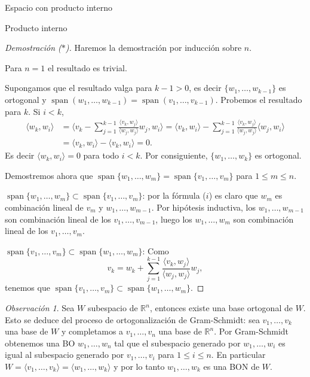 \documentclass[a4paper,12pt,twoside,spanish]{amsbook}
\theoremstyle{definition}
\theoremstyle{remark}
\newtheorem{obs}{Observaci\'on}[section]
\newcommand{\la}{\langle}
\newcommand{\ra}{\rangle}
\newcommand{\R}{\mathbb R}
\begin{document}
\begin{chapter}{Espacio con producto interno}
\begin{section}{Producto interno}
\begin{proof}[Demostración ($*$)]
			
			Haremos la demostración por inducción sobre $n$. 
			
			Para $n= 1$ el resultado es trivial.
			
			Supongamos que el resultado valga para $k-1>0$, es decir  $\{w_1,\ldots, w_{k-1}\}$ es ortogonal y 
			$\operatorname{span}(w_1,\ldots, w_{k-1}) = \operatorname{span}(v_1,\ldots, v_{k-1})$. Probemos el resultado para $k$.  Si  $i < k$, 
			\begin{align*}
			\la w_k, w_i \ra &= \la  v_k - \sum_{j = 1}^{k-1} \frac{\la v_k,w_{j}\ra}{\la w_{j},w_{j}\ra}w_{j} , w_i \ra 
			= \la v_k, w_i\ra -  \sum_{j = 1}^{k-1} \frac{\la v_k,w_{j}\ra}{\la w_{j},w_{j}\ra}\la w_{j} , w_i \ra \\
			&=  \la v_k, w_i\ra -  \la v_k, w_i\ra = 0.
			\end{align*}
			Es decir $	\la w_k, w_i \ra =0$ para todo $i < k$. Por consiguiente,  $\{w_1,\ldots, w_{k}\}$ es ortogonal.
			
			Demostremos ahora que $\operatorname{span}\{w_1,\ldots, w_{m}\} = \operatorname{span}\{v_1,\ldots, v_{m}\}$ para $1 \le m \le n$. 
			
			$\operatorname{span}\{w_1,\ldots, w_{m}\} \subset \operatorname{span}\{v_1,\ldots, v_{m}\}$: por la fórmula ($i$) es claro que $w_m$  es combinación lineal de $v_m$ y $w_1,\ldots, w_{m-1}$. Por hipótesis inductiva, los $w_1,\ldots, w_{m-1}$ son combinación lineal de  los $v_1,\ldots, v_{m-1}$,  luego los $w_1,\ldots, w_{m}$ son combinación lineal de los  $v_1,\ldots, v_{m}$.
			
			$\operatorname{span}\{v_1,\ldots, v_{m}\} \subset \operatorname{span}\{w_1,\ldots, w_{m}\}$: Como
			$$
			v_k = w_k + \sum_{j = 1}^{k-1} \frac{\la v_k,w_{j}\ra}{\la w_{j},w_{j}\ra}w_{j},
			$$
			tenemos que 	$\operatorname{span}\{v_1,\ldots, v_{m}\} \subset \operatorname{span}\{w_1,\ldots, w_{m}\}$.
		\end{proof}
		
		
		\medskip
		
		\begin{obs} Sea $W$ subespacio de $\R^n$, entonces existe una base ortogonal de $W$. Esto se deduce del proceso de ortogonalización de Gram-Schmidt: sea $v_1,\ldots,v_k$ una base de $W$ y completamos a $v_{1},\ldots,v_n$ una base de $\R^n$. Por Gram-Schmidt obtenemos una BO $w_{1},\ldots,w_n$ tal que el subespacio generado  por $w_{1},\ldots,w_i$ es igual al subespacio generado por $v_{1},\ldots,v_i$ para $1 \le i \le n$. En  particular $W = \la v_{1},\ldots,v_k \ra =  \la w_{1},\ldots,w_k \ra$ y por lo tanto  $w_{1},\ldots,w_k$ es una BON de $W$.
			

\end{obs}
\end{section}
\end{chapter}
\end{document}
